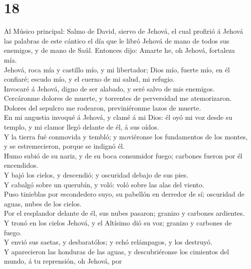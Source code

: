 \hypertarget{section-19-18}{%
\section{18}\label{section-19-18}}

 Al Músico principal: Salmo de David, siervo de Jehová, el
cual profirió á Jehová las palabras de este cántico el día que le libró
Jehová de mano de todos sus enemigos, y de mano de Saúl. Entonces dijo:
Amarte he, oh Jehová, fortaleza mía.\\
 Jehová, roca mía y castillo mío, y mi libertador; Dios
mío, fuerte mío, en él confiaré; escudo mío, y el cuerno de mi salud, mi
refugio.\\
 Invocaré á Jehová, digno de ser alabado, y seré salvo de
mis enemigos.\\
 Cercáronme dolores de muerte, y torrentes de perversidad
me atemorizaron.\\
 Dolores del sepulcro me rodearon, previniéronme lazos de
muerte.\\
 En mi angustia invoqué á Jehová, y clamé á mi Dios: él
oyó mi voz desde su templo, y mi clamor llegó delante de él, á sus
oídos.\\
 Y la tierra fué conmovida y tembló; y moviéronse los
fundamentos de los montes, y se estremecieron, porque se indignó él.\\
 Humo subió de su nariz, y de su boca consumidor fuego;
carbones fueron por él encendidos.\\
 Y bajó los cielos, y descendió; y oscuridad debajo de sus
pies.\\
 Y cabalgó sobre un querubín, y voló: voló sobre las alas
del viento.\\
 Puso tinieblas por escondedero suyo, su pabellón en
derredor de sí; oscuridad de aguas, nubes de los cielos.\\
 Por el resplandor delante de él, sus nubes pasaron;
granizo y carbones ardientes.\\
 Y tronó en los cielos Jehová, y el Altísimo dió su voz;
granizo y carbones de fuego.\\
 Y envió sus saetas, y desbaratólos; y echó relámpagos, y
los destruyó.\\
 Y aparecieron las honduras de las aguas, y
descubriéronse los cimientos del mundo, á tu reprensión, oh Jehová, por
